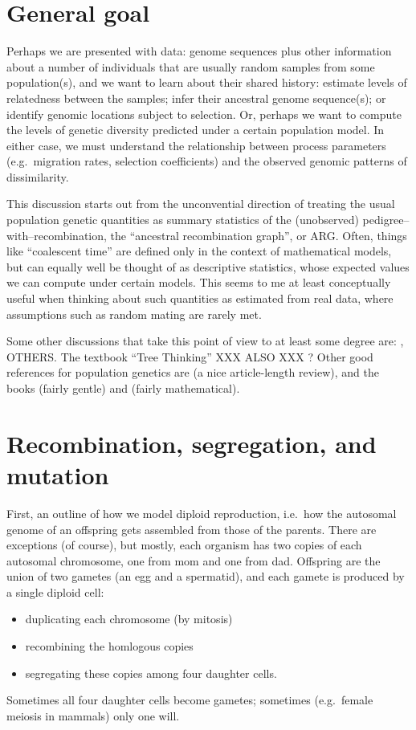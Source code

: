 
\section*{General goal}

Perhaps we are presented with data: genome sequences plus other information
about a number of individuals that are usually random samples from some population(s),
and we want to learn about their shared history: 
estimate levels of relatedness between the samples;
infer their ancestral genome sequence(s);
or identify genomic locations subject to selection.
Or, perhaps we want to compute the levels of genetic diversity 
predicted under a certain population model.
In either case, we must understand the relationship between process parameters
(e.g.\ migration rates, selection coefficients)
and the observed genomic patterns of dissimilarity.

This discussion starts out from the unconvential direction
of treating the usual population genetic quantities as summary statistics
of the (unobserved) pedigree--with--recombination, the ``ancestral recombination graph'', or ARG.
Often, things like ``coalescent time'' are defined only in the context of mathematical models,
but can equally well be thought of as descriptive statistics,
whose expected values we can compute under certain models.
This seems to me at least conceptually useful when thinking about such quantities
as estimated from real data, where assumptions such as random mating are rarely met.

Some other discussions that take this point of view to at least some degree are:
\citet{mcvean2002linkage}, OTHERS.
The textbook ``Tree Thinking'' XXX ALSO XXX ?
Other good references for population genetics are
\citet{hudson1990gene} (a nice article-length review), 
and the books
\citet{wakeley2005coalescent} (fairly gentle)
and \citet{ewens2004mathematical} (fairly mathematical).


\section{Recombination, segregation, and mutation}

First, an outline of how we model diploid reproduction, 
i.e.\ how the autosomal genome of an offspring gets assembled from those of the parents.
There are exceptions (of course), but mostly,
each organism has two copies of each autosomal chromosome, 
one from mom and one from dad.
Offspring are the union of two gametes (an egg and a spermatid),
and each gamete is produced by a single diploid cell:
\begin{itemize}
    \item duplicating each chromosome (by mitosis)
    \item recombining the homlogous copies
    \item segregating these copies among four daughter cells.
\end{itemize}
Sometimes all four daughter cells become gametes;
sometimes (e.g.\ female meiosis in mammals) only one will.


